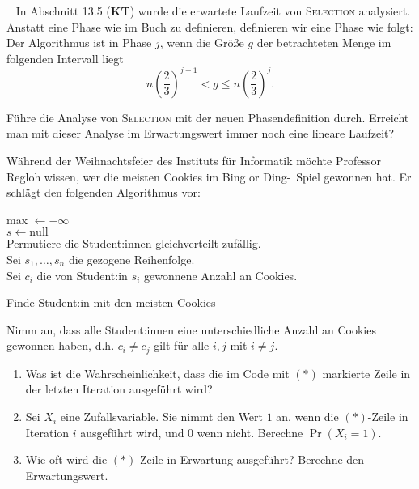 \documentclass{uebung_cs}
\begin{document}
\begin{aufgabe}\
	In Abschnitt 13.5 (\textbf{KT}) wurde die erwartete Laufzeit von \textsc{Selection} analysiert.
	Anstatt eine Phase wie im Buch zu definieren, definieren wir eine Phase wie folgt:
	Der Algorithmus ist in Phase $j$, wenn die Größe $g$ der betrachteten Menge im folgenden Intervall liegt
	\[n\left(\frac{2}{3}\right)^{j+1} < g \leq n\left(\frac{2}{3}\right)^j. \]
	
	Führe die Analyse von \textsc{Selection} mit der neuen Phasendefinition durch. Erreicht man mit dieser Analyse im Erwartungswert immer noch eine lineare Laufzeit?
\end{aufgabe}    

\begin{aufgabe}[Weihnachtsfeier im Institut]
	Während der Weihnachtsfeier des Instituts für Informatik möchte Professor Regloh wissen, wer die meisten Cookies im \glqq Bing or Ding\grqq{}-~Spiel gewonnen hat. Er schlägt den folgenden Algorithmus vor: 

	\begin{algorithm}[H]
		\SetAlgoLined
		max $\gets -\infty$\\
		$s \gets \text{null}$\\
		Permutiere die Student:innen gleichverteilt zufällig. \\
		Sei $s_1,\dots,s_n$ die gezogene Reihenfolge.\\
		Sei $c_i$ die von Student:in $s_i$ gewonnene Anzahl an Cookies.\\
		\caption{Finde Student:in mit den meisten Cookies}
\end{algorithm}
	
	Nimm an, dass alle Student:innen eine unterschiedliche Anzahl an Cookies gewonnen haben, d.h. $c_i \neq c_j$ gilt für alle $i,j$ mit $i \neq j$.
	\begin{enumerate}
		\item Was ist die Wahrscheinlichkeit, dass die im Code mit $(\ast)$ markierte Zeile in der letzten Iteration ausgeführt wird?
		\item Sei $X_i$ eine Zufallsvariable. Sie nimmt den Wert $1$ an, wenn die $(\ast)$-Zeile in Iteration $i$ ausgeführt wird, und $0$ wenn nicht. Berechne $\Pr(X_i = 1)$.%
		\item Wie oft wird die $(\ast)$-Zeile in Erwartung ausgeführt? Berechne den Erwartungswert.
	\end{enumerate}
\end{aufgabe}
\end{document}
